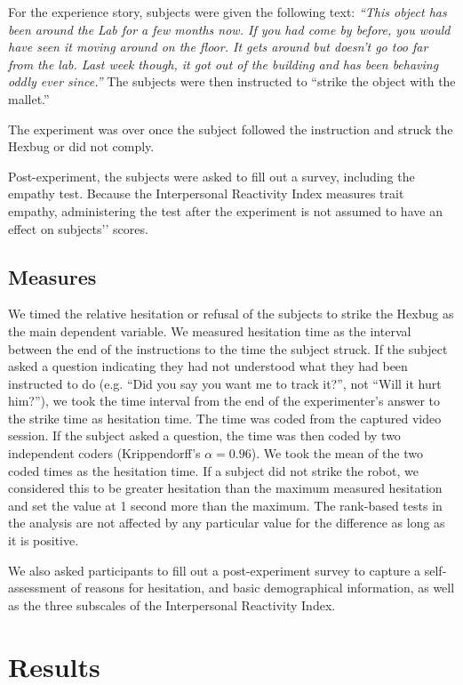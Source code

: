 For the experience story, subjects were given the following text: \emph{``This object has been around the Lab for a few months now. If you had come by before, you would have seen it moving around on the floor. It gets around but doesn't go too far from the lab. Last week though, it got out of the building and has been behaving oddly ever since.''} The subjects were then instructed to ``strike the object with the mallet.''


The experiment was over once the subject followed the instruction and struck the Hexbug or did not comply.


Post-experiment, the subjects were asked to fill out a survey, including the empathy test. Because the Interpersonal Reactivity Index measures trait empathy, administering the test after the experiment is not assumed to have an effect on subjects'’ scores.
 
\subsection{Measures}


We timed the relative hesitation or refusal of the subjects to strike the Hexbug as the main dependent variable. We measured hesitation time as the interval between the end of the instructions to the time the subject struck. If the subject asked a question indicating they had not understood what they had been instructed to do (e.g. ``Did you say you want me to track it?'', not ``Will it hurt him?''), we took the time interval from the end of the experimenter's answer to the strike time as hesitation time. The time was coded from the captured video session. If the subject asked a question, the time was then coded by two independent coders (Krippendorff's $\alpha=0.96$). We took the mean of the two coded times as the hesitation time. 
If a subject did not strike the robot, we considered this to be greater hesitation than the maximum measured hesitation and set the value at 1 second more than the maximum. The rank-based tests in the analysis are not affected by any particular value for the difference as long as it is positive. 

We also asked participants to fill out a post-experiment survey to capture a self-assessment of reasons for hesitation, and basic demographical information, as well as the three subscales of the Interpersonal Reactivity Index.  

\section{Results}
